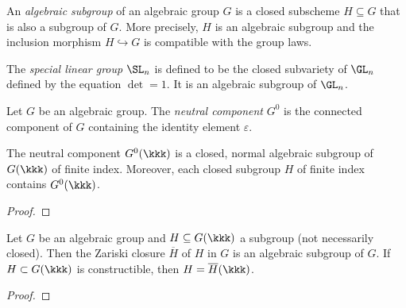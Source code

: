     \begin{definition}\label{def:algebraic_subgroup}
        An \emph{algebraic subgroup} of an algebraic group \(G\) is a closed subscheme \(H \subseteq G\) that is also a subgroup of \(G\).
        More precisely, \(H\) is an algebraic subgroup and the inclusion morphism \(H \hookrightarrow G\) is compatible with the group laws.
    \end{definition}

    \begin{example}\label{eg:special_linear_group}
        The \emph{special linear group} $\SL_n$ is defined to be the closed subvariety of $\GL_n$ defined by the equation \(\det = 1\).
        It is an algebraic subgroup of \(\GL_n\).
    \end{example}

    \begin{definition}\label{def:neutral_component}
        Let \(G\) be an algebraic group.
        The \emph{neutral component} \(G^0\) is the connected component of \(G\) containing the identity element \(\varepsilon\).
    \end{definition}

    \begin{proposition}\label{prop:neutral_component_is_subgroup}
        The neutral component \(G^0(\kkk)\) is a closed, normal algebraic subgroup of \(G(\kkk)\) of finite index.
        Moreover, each closed subgroup \(H\) of finite index contains \(G^0(\kkk)\).
    \end{proposition}
    \begin{proof}
    \end{proof}

    \begin{proposition}\label{prop:closure_of_subgroup_is_subgroup}
        Let \(G\) be an algebraic group and \(H \subseteq G(\kkk)\) a subgroup (not necessarily closed).
        Then the Zariski closure \(\overline{H}\) of \(H\) in \(G\) is an algebraic subgroup of \(G\).
        If \(H \subset G(\kkk)\) is constructible, then \(H = \overline{H}(\kkk)\).
    \end{proposition}
    \begin{proof}
    \end{proof}

